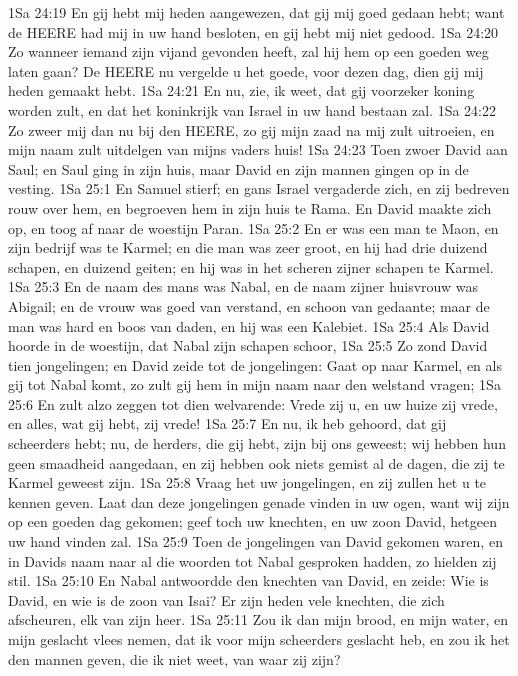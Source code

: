 1Sa 24:19  En gij hebt mij heden aangewezen, dat gij mij goed gedaan hebt; want de HEERE had mij in uw hand besloten, en gij hebt mij niet gedood.
1Sa 24:20  Zo wanneer iemand zijn vijand gevonden heeft, zal hij hem op een goeden weg laten gaan? De HEERE nu vergelde u het goede, voor dezen dag, dien gij mij heden gemaakt hebt.
1Sa 24:21  En nu, zie, ik weet, dat gij voorzeker koning worden zult, en dat het koninkrijk van Israel in uw hand bestaan zal.
1Sa 24:22  Zo zweer mij dan nu bij den HEERE, zo gij mijn zaad na mij zult uitroeien, en mijn naam zult uitdelgen van mijns vaders huis!
1Sa 24:23  Toen zwoer David aan Saul; en Saul ging in zijn huis, maar David en zijn mannen gingen op in de vesting.
1Sa 25:1  En Samuel stierf; en gans Israel vergaderde zich, en zij bedreven rouw over hem, en begroeven hem in zijn huis te Rama. En David maakte zich op, en toog af naar de woestijn Paran.
1Sa 25:2  En er was een man te Maon, en zijn bedrijf was te Karmel; en die man was zeer groot, en hij had drie duizend schapen, en duizend geiten; en hij was in het scheren zijner schapen te Karmel.
1Sa 25:3  En de naam des mans was Nabal, en de naam zijner huisvrouw was Abigail; en de vrouw was goed van verstand, en schoon van gedaante; maar de man was hard en boos van daden, en hij was een Kalebiet.
1Sa 25:4  Als David hoorde in de woestijn, dat Nabal zijn schapen schoor,
1Sa 25:5  Zo zond David tien jongelingen; en David zeide tot de jongelingen: Gaat op naar Karmel, en als gij tot Nabal komt, zo zult gij hem in mijn naam naar den welstand vragen;
1Sa 25:6  En zult alzo zeggen tot dien welvarende: Vrede zij u, en uw huize zij vrede, en alles, wat gij hebt, zij vrede!
1Sa 25:7  En nu, ik heb gehoord, dat gij scheerders hebt; nu, de herders, die gij hebt, zijn bij ons geweest; wij hebben hun geen smaadheid aangedaan, en zij hebben ook niets gemist al de dagen, die zij te Karmel geweest zijn.
1Sa 25:8  Vraag het uw jongelingen, en zij zullen het u te kennen geven. Laat dan deze jongelingen genade vinden in uw ogen, want wij zijn op een goeden dag gekomen; geef toch uw knechten, en uw zoon David, hetgeen uw hand vinden zal.
1Sa 25:9  Toen de jongelingen van David gekomen waren, en in Davids naam naar al die woorden tot Nabal gesproken hadden, zo hielden zij stil.
1Sa 25:10  En Nabal antwoordde den knechten van David, en zeide: Wie is David, en wie is de zoon van Isai? Er zijn heden vele knechten, die zich afscheuren, elk van zijn heer.
1Sa 25:11  Zou ik dan mijn brood, en mijn water, en mijn geslacht vlees nemen, dat ik voor mijn scheerders geslacht heb, en zou ik het den mannen geven, die ik niet weet, van waar zij zijn?
